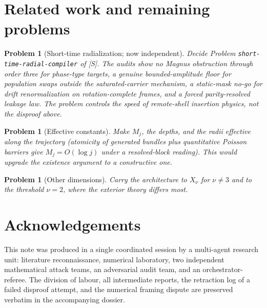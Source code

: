 \documentclass[11pt]{article}
\newtheorem{problem}[theorem]{Problem}
\theoremstyle{remark}
\theoremstyle{definition}
\begin{document}
\section{Related work and remaining problems}

\begin{problem}[Short-time radialization; now independent]
Decide Problem \texttt{short-time-radial-compiler} of [S].  The audits show
no Magnus obstruction through order three for phase-type targets, a genuine
bounded-amplitude floor for population swaps outside the saturated-carrier
mechanism, a static-mask no-go for drift renormalization on rotation-complete
frames, and a forced parity-resolved leakage law.  The problem controls the
speed of remote-shell insertion physics, not the disproof above.
\end{problem}

\begin{problem}[Effective constants]
Make $M_j$, the depths, and the radii effective along the trajectory
(atomicity of generated bundles plus quantitative Poisson barriers give
$M_j=O(\log j)$ under a resolved-block reading).  This would upgrade the
existence argument to a constructive one.
\end{problem}

\begin{problem}[Other dimensions]
Carry the architecture to $X_\nu$ for $\nu\neq3$ and to the threshold
$\nu=2$, where the exterior theory differs most.
\end{problem}

\section*{Acknowledgements}
This note was produced in a single coordinated session by a multi-agent
research unit: literature reconnaissance, numerical laboratory, two
independent mathematical attack teams, an adversarial audit team, and an
orchestrator-referee.  The division of labour, all intermediate reports,
the retraction log of a failed disproof attempt, and the numerical framing
dispute are preserved verbatim in the accompanying dossier.
\end{document}
